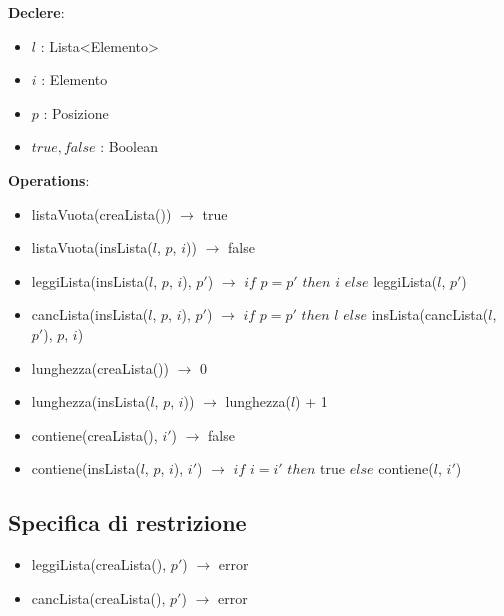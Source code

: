 \documentclass[italian,12pt,a4paper]{article}
\begin{document}
	\textbf{Declere}:
	\begin{itemize}
		\item $l$ : Lista<Elemento>
		\item $i$ : Elemento
		\item $p$ : Posizione
		\item ${true, false}$ : Boolean
	\end{itemize}
	
	\textbf{Operations}:
	
	\begin{itemize}
		\item listaVuota(creaLista()) $\rightarrow$ true
		\item listaVuota(insLista($l$, $p$, $i$)) $\rightarrow$ false
		
		\item leggiLista(insLista($l$, $p$, $i$), $p'$) $\rightarrow$ $if$ $p=p'$ $then$ $i$ $else$ leggiLista($l$, $p'$)
		
		\item cancLista(insLista($l$, $p$, $i$), $p'$) $\rightarrow$ $if$ $p=p'$ $then$ $l$ $else$ insLista(cancLista($l$, $p'$), $p$, $i$)
		
		\item lunghezza(creaLista()) $\rightarrow$ 0
		\item lunghezza(insLista($l$, $p$, $i$)) $\rightarrow$ lunghezza($l$) + 1
		
		\item contiene(creaLista(), $i'$) $\rightarrow$ false
		\item contiene(insLista($l$, $p$, $i$), $i'$) $\rightarrow$ $if$ $i=i'$ $then$ true $else$ contiene($l$, $i'$)
	\end{itemize}
	
	\subsection{Specifica di restrizione}
	
	\begin{itemize}
		\item leggiLista(creaLista(), $p'$) $\rightarrow$ error
		\item cancLista(creaLista(), $p'$) $\rightarrow$ error
	\end{itemize}
	
\end{document}
